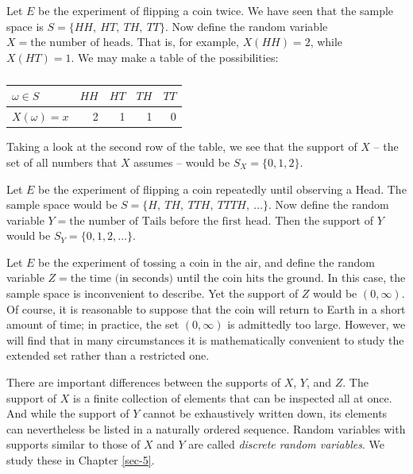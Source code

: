 \documentclass[captions=tableheading]{scrbook}
\begin{document}
\begin{example}
Let \(E\) be the experiment of flipping a coin twice. We have seen that the sample space is \( S = \{ HH,\ HT,\ TH,\ TT \} \). Now define the random variable \(X = \mbox{the number of heads}\). That is, for example, \(X(HH)=2\), while \(X(HT)=1\). We may make a table of the possibilities:

\begin{table}[htb]
\caption{} \label{exa-misfiling-assistants-multiple}
\begin{center}
\begin{tabular}{lrrrr}
 \(\omega\in S\)  &  \(HH\)  &  \(HT\)  &  \(TH\)  &  \(TT\)  \\
\hline
 \(X(\omega)=x\)  &       2  &       1  &       1  &       0  \\
\end{tabular}
\end{center}
\end{table}


Taking a look at the second row of the table, we see that the support of \(X\) -- the set of all numbers that \(X\) assumes -- would be \( S_{X}= \{ 0,1,2 \} \).
\end{example}

\begin{example}
Let \(E\) be the experiment of flipping a coin repeatedly until observing a Head. The sample space would be \(S= \{ H,\ TH,\ TTH,\ TTTH,\ \ldots \} \). Now define the random variable \(Y=\mbox{the number of Tails before the first head}\). Then the support of \(Y\) would be \( S_{Y}= \{ 0,1,2,\ldots \} \).
\end{example}

\begin{example}
Let \(E\) be the experiment of tossing a coin in the air, and define the random variable \( Z = \mbox{the time (in seconds) until the coin hits the ground} \). In this case, the sample space is inconvenient to describe. Yet the support of \(Z\) would be \((0,\infty)\). Of course, it is reasonable to suppose that the coin will return to Earth in a short amount of time; in practice, the set \((0,\infty)\) is admittedly too large. However, we will find that in many circumstances it is mathematically convenient to study the extended set rather than a restricted one. 
\end{example}

There are important differences between the supports of \(X\), \(Y\), and \(Z\). The support of \(X\) is a finite collection of elements that can be inspected all at once. And while the support of \(Y\) cannot be exhaustively written down, its elements can nevertheless be listed in a naturally ordered sequence. Random variables with supports similar to those of \(X\) and \(Y\) are called \emph{discrete random variables}. We study these in Chapter \ref{sec-5}.
\end{document}
